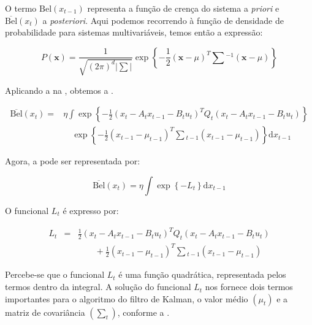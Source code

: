O termo $\text{Bel}(x_{t-1})$ representa a função de crença do sistema a \textit{priori} e $\overline{\text{Bel}}(x_t)$ a \textit{posteriori}. Aqui podemos recorrendo à função de densidade de probabilidade para sistemas multivariáveis, temos então a expressão:

\begin{equation}
    \label{eq:bayes03}
    P(\mathbf{x}) = \frac{1}{\sqrt{(2\pi)^{d}|\sum|}}\exp\left\{-\frac{1}{2} (\mathbf{x}-\mu)^T\textstyle\sum{}^{-1}(\mathbf{x}-\mu)\right\}
\end{equation}        

Aplicando a  na , obtemos a .

\begin{equation}
    \begin{matrix}
        \label{eq:bayes04}
        \overline{\text{Bel}}(x_t)= &  \eta \displaystyle\int \exp\left\{  -\frac{1}{2} \left(x_t - A_t x_{t-1} - B_t u_t\right)^T Q_t \left(x_t - A_t x_{t-1} - B_t u_t\right)  \right\} \\
        & \quad\exp\left\{ -\displaystyle\frac{1}{2} \left(x_{t-1} - \mu_{t-1}\right)^T \textstyle\sum {}_{t-1} \left(x_{t-1} - \mu_{t-1}\right)  \right\}\text{d}x_{t-1}
    \end{matrix}
\end{equation}

Agora, a  pode ser representada por:

\begin{equation}
    \overline{\text{Bel}}(x_t)= \eta \displaystyle\int \exp\left\{ -L_t \right\}\text{d}x_{t-1}
\end{equation}

O funcional $L_t$ é expresso por:

\begin{equation}
    \begin{matrix}
        L_t&  = & \displaystyle\frac{1}{2} \left(x_t - A_t x_{t-1} - B_t u_t\right)^T Q_t \left(x_t - A_t x_{t-1} - B_t u_t\right) \\
        & & \quad\quad + \displaystyle\frac{1}{2} \left(x_{t-1} - \mu_{t-1}\right)^T \textstyle\sum {}_{t-1} \left(x_{t-1} - \mu_{t-1}\right)
    \end{matrix}
\end{equation}

Percebe-se que o funcional $L_t$ é uma função quadrática, representada pelos termos dentro da integral. A solução do funcional $L_t$ nos fornece dois termos importantes para o algoritmo do filtro de Kalman, o valor médio $\left(\mu_t\right)$ e a matriz de covariância $\left(\sum_t\right)$, conforme a .

